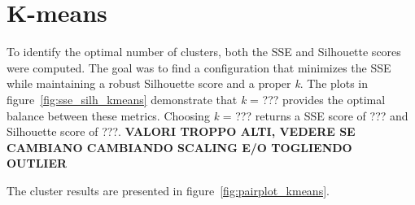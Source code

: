 \section{K-means}\label{sec:centroid_based}

To identify the optimal number of clusters, both the SSE and Silhouette scores were computed. The goal was to find a configuration that minimizes the SSE while maintaining a robust Silhouette score and a proper \textit{k}. 
The plots in figure~\ref{fig:sse_silh_kmeans} demonstrate that \textit{k} = ??? provides the optimal balance between these metrics. Choosing \textit{k} = ??? returns a SSE score of ??? and Silhouette score of ???. 
\textbf{VALORI TROPPO ALTI, VEDERE SE CAMBIANO CAMBIANDO SCALING E/O TOGLIENDO OUTLIER}

The cluster results are presented in figure~\ref{fig:pairplot_kmeans}. 

